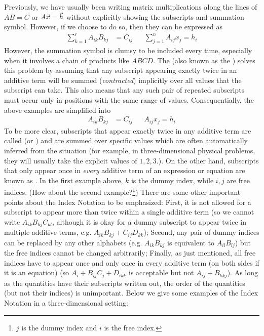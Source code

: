 Previously, we have usually been writing matrix multiplications along the lines of $AB = C$ or $A\vec{x} = \smash{\vec{h}}$ without explicitly showing the subscripts and summation symbol. However, if we choose to do so, then they can be expressed as
\begin{align*}
\sum_{k=1}^r A_{ik}B_{kj} &= C_{ij} &  & \sum_{j=1}^n A_{ij}x_j = h_i
\end{align*}
However, the summation symbol is clumsy to be included every time, especially when it involves a chain of products like $ABCD$. The  (also known as the ) solves this problem by assuming that any subscript appearing exactly twice in an additive term will be summed (\textit{contracted}) implicitly over all values that the subscript can take. This also means that any such pair of repeated subscripts must
occur only in positions with the same range of values. Consequentially, the above examples are simplified into
\begin{align*}
A_{ik}B_{kj} &= C_{ij} &  & A_{ij}x_j = h_i    
\end{align*}
To be more clear, subscripts that appear exactly twice in any additive term are called  (or ) and are summed over specific values which are often automatically inferred from the situation (for example, in three-dimensional physical problems, they will usually take the explicit values of $1,2,3$.). On the other hand, subscripts that only appear once in \textit{every} additive term of an expression or equation are known as . In the first example above, $k$ is the dummy index, while $i, j$ are free indices. (How about the second example?\footnote{$j$ is the dummy index and $i$ is the free index.}) There are some other important points about the Index Notation to be emphasized: First, it is not allowed for a subscript to appear more than twice within a single additive term (so we cannot write $A_{ik}B_{kj}C_{kl}$, although it is okay for a dummy subscript to appear twice in multiple additive terms, e.g. $A_{ik}B_{kj} + C_{ij}D_{kk}$); Second, any pair of dummy indices can be replaced by any other alphabets (e.g. $A_{ik}B_{kj}$ is equivalent to $A_{il}B_{lj}$) but the free indices cannot be changed arbitrarily; Finally, as just mentioned, all free indices have to appear once and only once in every additive term (on both sides if it is an equation) (so $A_i + B_{ij}C_{j} + D_{ikk}$ is acceptable but not $A_{ij} + B_{kkj}$). As long as the quantities have their subscripts written out, the order of the quantities (but not their indices) is unimportant. Below we give some examples of the Index Notation in a three-dimensional setting:
